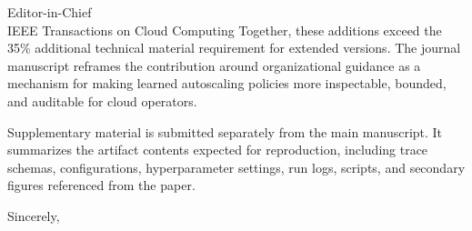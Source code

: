 \documentclass[11pt]{letter}
\begin{document}
\begin{letter}{Editor-in-Chief\\IEEE Transactions on Cloud Computing}
  Together, these additions exceed the 35\% additional technical material requirement for extended versions. The journal manuscript reframes the contribution around organizational guidance as a mechanism for making learned autoscaling policies more inspectable, bounded, and auditable for cloud operators.

  Supplementary material is submitted separately from the main manuscript. It summarizes the artifact contents expected for reproduction, including trace schemas, configurations, hyperparameter settings, run logs, scripts, and secondary figures referenced from the paper.

  \closing{Sincerely,}

\end{letter}
\end{document}
